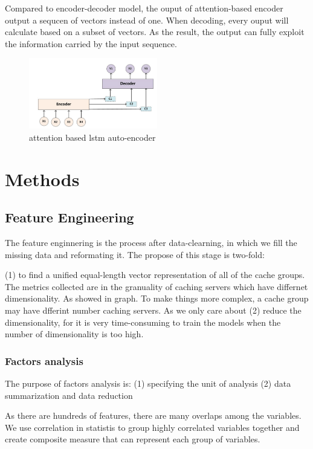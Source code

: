 \documentclass[5p]{elsarticle}
\begin{document}
Compared to encoder-decoder model, the ouput of attention-based encoder output a sequcen of vectors instead of one. When decoding, every ouput will calculate based on a subset of vectors. As the result, the output can fully exploit the information carried by the input sequence.


\begin{figure}[h]
    \centering
    \includegraphics[width=0.5\textwidth]{attention_based_encoder_decoder.png}
    \caption{attention based lstm auto-encoder}
    \label{fig:neural_network_architecture}
\end{figure}


\section{Methods}
\subsection{Feature Engineering}
The feature enginnering is the process after data-clearning, in which we fill the missing data and reformating it. The propose of this stage is two-fold:

(1) to find a unified equal-length vector representation of all of the cache groups. 
The metrics collected are in the granuality of caching servers which have differnet dimensionality. As showed in graph. To make things more complex, a cache group may have dfferint number caching servers. As we only care about
(2) reduce the dimensionality, for it is very time-consuming to train the models when the number of dimensionality is too high.

\subsubsection{Factors analysis}
The purpose of factors analysis is: (1) specifying the unit of analysis (2) data summarization and data reduction

As there are hundreds of features, there are many overlaps among the variables. We use correlation in statistis to group highly correlated variables together and create composite measure that can represent each group of variables.
\end{document}
